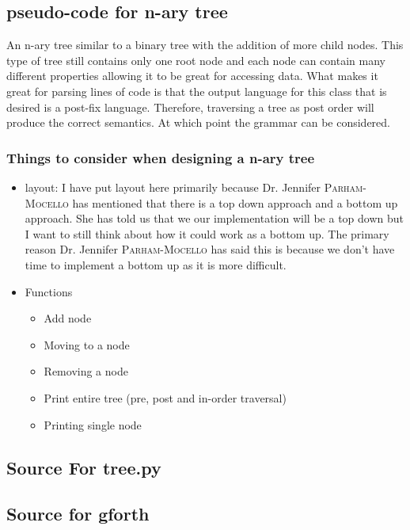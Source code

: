 \documentclass[letterpaper,10pt]{article}
\def\supervisor{Dr. Jennifer \textsc{Parham-Mocello }} %
\begin{document}
\subsection{pseudo-code for n-ary tree}
An n-ary tree similar to a binary tree with the addition of more child nodes. This type of tree still contains only one root node and each node can contain many different properties allowing it to be great for accessing data. What makes it great for parsing lines of code is that the output language for this class that is desired is a post-fix language. Therefore, traversing a tree as post order will produce the correct semantics. At which point the grammar can be considered.

\subsubsection{Things to consider when designing a n-ary tree}
\begin{itemize}
\item layout: I have put layout here primarily because \supervisor  has mentioned that there is a top down approach and a bottom up approach. She has told us that we our implementation will be a top down but I want to still think about how it could work as a bottom up. The primary reason \supervisor has said this is because we don't have time to implement a bottom up as it is more difficult.  
\item Functions
\begin{itemize}
\item Add node
\item Moving to a node
\item Removing a node
\item Print entire tree (pre, post and in-order traversal)
\item Printing single node
\end{itemize}

\end{itemize}

\newpage
\subsection{Source For tree.py}

\newpage
\subsection{Source for gforth}

\end{document}
